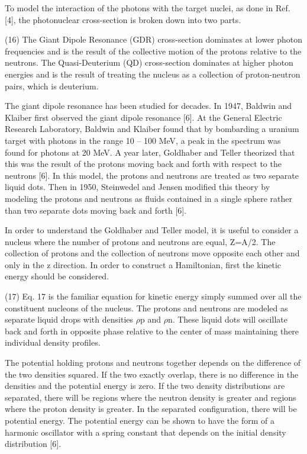     To model the interaction of the photons with the target nuclei, as done in Ref.
    [4], the photonuclear cross-section is broken down into two parts.
    
    (16)
    The Giant Dipole Resonance (GDR) cross-section dominates at lower photon frequencies and is the result of the collective motion of the protons relative to the neutrons.
    The Quasi-Deuterium (QD) cross-section dominates at higher photon energies and is the result of treating the nucleus as a collection of proton-neutron pairs, which is deuterium.

    The giant dipole resonance has been studied for decades.
    In 1947, Baldwin and Klaiber first observed the giant dipole resonance [6].
    At the General Electric Research Laboratory, Baldwin and Klaiber found that by bombarding a uranium target with photons in the range 10 – 100 MeV, a peak in the spectrum was found for photons at 20 MeV.
    A year later, Goldhaber and Teller theorized that this was the result of the protons moving back and forth with respect to the neutrons [6].
    In this model, the protons and neutrons are treated as two separate liquid dots.
    Then in 1950, Steinwedel and Jensen modified this theory by modeling the protons and neutrons as fluids contained in a single sphere rather than two separate dots moving back and forth [6].
    
    In order to understand the Goldhaber and Teller model, it is useful to consider a nucleus where the number of protons and neutrons are equal, Z=A/2.
    The collection of protons and the collection of neutrons move opposite each other and only in the z direction.
    In order to construct a Hamiltonian, first the kinetic energy should be considered.
    
    (17)
    Eq.
    17 is the familiar equation for kinetic energy simply summed over all the constituent nucleons of the nucleus.
    The protons and neutrons are modeled as separate liquid drops with densities $\rho$p and  $\rho$n.
    These liquid dots will oscillate back and forth in opposite phase relative to the center of mass maintaining there individual density profiles.
    
    The potential holding protons and neutrons together depends on the difference of the two densities squared.
    If the two exactly overlap, there is no difference in the densities and the potential energy is zero.
    If the two density distributions are separated, there will be regions where the neutron density is greater and regions where the proton density is greater.
    In the separated configuration, there will be potential energy.
    The potential energy can be shown to have the form of a harmonic oscillator with a spring constant that depends on the initial density distribution [6].

